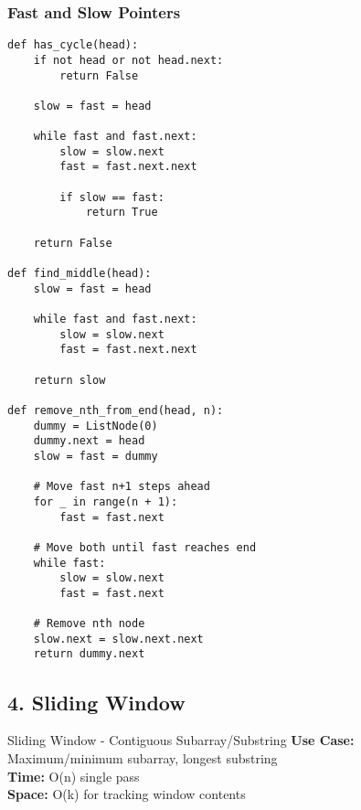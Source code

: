 \documentclass[10pt,a4paper]{article}
\begin{document}
\subsubsection{Fast and Slow Pointers}
\begin{lstlisting}
def has_cycle(head):
    if not head or not head.next:
        return False

    slow = fast = head

    while fast and fast.next:
        slow = slow.next
        fast = fast.next.next

        if slow == fast:
            return True

    return False

def find_middle(head):
    slow = fast = head

    while fast and fast.next:
        slow = slow.next
        fast = fast.next.next

    return slow

def remove_nth_from_end(head, n):
    dummy = ListNode(0)
    dummy.next = head
    slow = fast = dummy

    # Move fast n+1 steps ahead
    for _ in range(n + 1):
        fast = fast.next

    # Move both until fast reaches end
    while fast:
        slow = slow.next
        fast = fast.next

    # Remove nth node
    slow.next = slow.next.next
    return dummy.next
\end{lstlisting}

\subsection{4. Sliding Window}

\begin{patternbox}{Sliding Window - Contiguous Subarray/Substring}
\textbf{Use Case:} Maximum/minimum subarray, longest substring\\
\textbf{Time:} O(n) single pass\\
\textbf{Space:} O(k) for tracking window contents
\end{patternbox}
\end{document}
